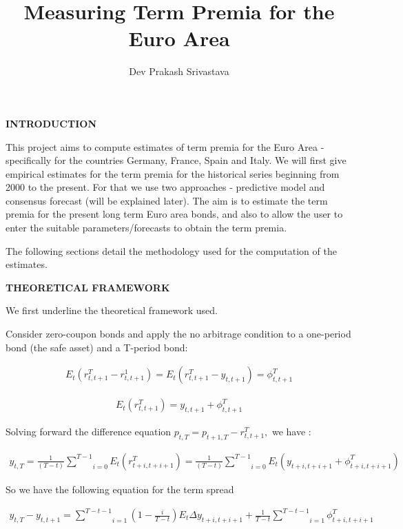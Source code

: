 \documentclass[
]{article}
\title{Measuring Term Premia for the Euro Area}
\author{}
\date{\vspace{-2.5em}Dev Prakash Srivastava}
\begin{document}
\maketitle

\textbf{INTRODUCTION}

This project aims to compute estimates of term premia for the Euro Area
- specifically for the countries Germany, France, Spain and Italy. We
will first give empirical estimates for the term premia for the
historical series beginning from 2000 to the present. For that we use
two approaches - predictive model and consensus forecast (will be
explained later). The aim is to estimate the term premia for the present
long term Euro area bonds, and also to allow the user to enter the
suitable parameters/forecasts to obtain the term premia.

The following sections detail the methodology used for the computation
of the estimates.

\textbf{THEORETICAL FRAMEWORK}

We first underline the theoretical framework used.

Consider zero-coupon bonds and apply the no arbitrage condition to a
one-period bond (the safe asset) and a T-period bond:

\begin{eqnarray*}
    E_{t}\left( r_{t,t+1}^{T} - r_{t,t+1}^{1}\right) = E_{t}\left(
        r_{t,t+1}^{T}-y_{t,t+1}\right) = \phi _{t,t+1}^{T}
\end{eqnarray*}

\begin{eqnarray*}
        E_{t}\left( r_{t,t+1}^{T}\right) = y_{t,t+1}+\phi _{t,t+1}^{T}
\end{eqnarray*}

Solving forward the difference equation
\(p_{t,T}=p_{t+1,T}-r_{t,t+1}^{T},\) we have :

\begin{eqnarray*}
        y_{t,T} = \frac{1}{\left( T-t\right) }\underset{i=0}{\overset{T-1}{\sum }}
        E_{t}\left( r_{t+i,t+i+1}^{T}\right)
        =\frac{1}{\left( T-t\right) }\underset{i=0}{\overset{T-1}{\sum }}
        E_{t}\left( y_{t+i,t+i+1}+\phi _{t+i,t+i+1}^{T}\right)
\end{eqnarray*}

So we have the following equation for the term spread

\begin{eqnarray*}
    y_{t,T}-y_{t,t+1}= \underset{i=1}{\overset{T-t-1}{\sum}}\left(1-\frac{i}{T-t}\right)E_{t}\Delta y_{t+i,t+i+1}+\frac{1}{T-t}\underset{i=1}{\overset{T-t-1}{\sum }}\phi _{t+i,t+i+1}^{T}
\end{eqnarray*}
\end{document}
